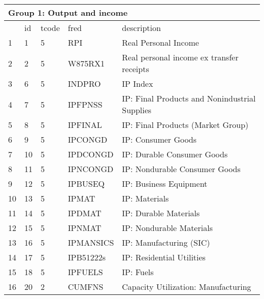 \begin{table}[ht] 
\centering 
\begin{tabular}{lllll} 
\multicolumn{5}{l}{Group 1: Output and income} \\
\toprule
 & id & tcode & fred & description \\
\midrule
1 & 1 & 5 & RPI & Real Personal Income \\
2 & 2 & 5 & W875RX1 & Real personal income ex transfer receipts \\
3 & 6 & 5 & INDPRO & IP Index \\
4 & 7 & 5 & IPFPNSS & IP: Final Products and Nonindustrial Supplies \\
5 & 8 & 5 & IPFINAL & IP: Final Products (Market Group) \\
6 & 9 & 5 & IPCONGD & IP: Consumer Goods \\
7 & 10 & 5 & IPDCONGD & IP: Durable Consumer Goods \\
8 & 11 & 5 & IPNCONGD & IP: Nondurable Consumer Goods \\
9 & 12 & 5 & IPBUSEQ & IP: Business Equipment \\
10 & 13 & 5 & IPMAT & IP: Materials \\
11 & 14 & 5 & IPDMAT & IP: Durable Materials \\
12 & 15 & 5 & IPNMAT & IP: Nondurable Materials \\
13 & 16 & 5 & IPMANSICS & IP: Manufacturing (SIC) \\
14 & 17 & 5 & IPB51222s & IP: Residential Utilities \\
15 & 18 & 5 & IPFUELS & IP: Fuels \\
16 & 20 & 2 & CUMFNS & Capacity Utilization: Manufacturing \\
\bottomrule
\end{tabular}  
\end{table} 